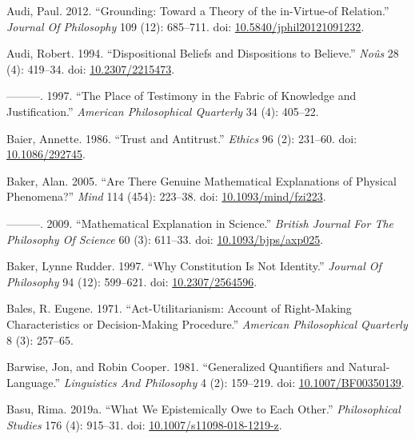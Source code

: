 \documentclass[
  10pt,
  letterpaper,
  DIV=11,
  numbers=noendperiod,
  twoside]{scrartcl}
\newlength{\cslhangindent}
\newenvironment{CSLReferences}[2] %
 {\begin{list}{}{%
  \setlength{\itemindent}{0pt}
  \setlength{\leftmargin}{0pt}
  \setlength{\parsep}{0pt}
  \ifodd #1
   \setlength{\leftmargin}{\cslhangindent}
   \setlength{\itemindent}{-1\cslhangindent}
  \fi
  \setlength{\itemsep}{#2\baselineskip}}}
 {\end{list}}
\begin{document}
\begin{CSLReferences}{1}{0}
Audi, Paul. 2012. {``Grounding: Toward a Theory of the in-Virtue-of
Relation.''} \emph{Journal Of Philosophy} 109 (12): 685--711. doi:
\href{https://doi.org/10.5840/jphil20121091232}{10.5840/jphil20121091232}.

Audi, Robert. 1994. {``Dispositional Beliefs and Dispositions to
Believe.''} \emph{Noûs} 28 (4): 419--34. doi:
\href{https://doi.org/10.2307/2215473}{10.2307/2215473}.

---------. 1997. {``The Place of Testimony in the Fabric of Knowledge
and Justification.''} \emph{American Philosophical Quarterly} 34 (4):
405--22.

Baier, Annette. 1986. {``Trust and Antitrust.''} \emph{Ethics} 96 (2):
231--60. doi: \href{https://doi.org/10.1086/292745}{10.1086/292745}.

Baker, Alan. 2005. {``Are There Genuine Mathematical Explanations of
Physical Phenomena?''} \emph{Mind} 114 (454): 223--38. doi:
\href{https://doi.org/10.1093/mind/fzi223}{10.1093/mind/fzi223}.

---------. 2009. {``Mathematical Explanation in Science.''}
\emph{British Journal For The Philosophy Of Science} 60 (3): 611--33.
doi: \href{https://doi.org/10.1093/bjps/axp025}{10.1093/bjps/axp025}.

Baker, Lynne Rudder. 1997. {``Why Constitution Is Not Identity.''}
\emph{Journal Of Philosophy} 94 (12): 599--621. doi:
\href{https://doi.org/10.2307/2564596}{10.2307/2564596}.

Bales, R. Eugene. 1971. {``Act-Utilitarianism: Account of Right-Making
Characteristics or Decision-Making Procedure.''} \emph{American
Philosophical Quarterly} 8 (3): 257--65.

Barwise, Jon, and Robin Cooper. 1981. {``Generalized Quantifiers and
Natural-Language.''} \emph{Linguistics And Philosophy} 4 (2): 159--219.
doi: \href{https://doi.org/10.1007/BF00350139}{10.1007/BF00350139}.

Basu, Rima. 2019a. {``What We Epistemically Owe to Each Other.''}
\emph{Philosophical Studies} 176 (4): 915--31. doi:
\href{https://doi.org/10.1007/s11098-018-1219-z}{10.1007/s11098-018-1219-z}.


\end{CSLReferences}
\end{document}
